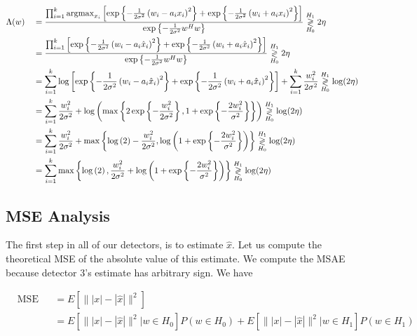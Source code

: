 \documentclass[english]{article}
\begin{document}
\begin{equation}
\begin{aligned}
&\Lambda(w)
&& = \frac{\prod_{i=1}^k\mathop{\rm argmax}_{x_i}\left[\exp\left\{-\frac{1}{2\sigma^2}\left(w_i-a_ix_i\right)^2\right\}+\exp\left\{-\frac{1}{2\sigma^2}\left(w_i+a_ix_i\right)^2\right\}\right]}{\exp\left\{-\frac{1}{2\sigma^2}w^Hw\right\}} \overset{H_1}{\underset{H_0}{\gtrless}} 2\eta\\
&&&=\frac{\prod_{i=1}^k\left[\exp\left\{-\frac{1}{2\sigma^2}\left(w_i-a_i\hat{x}_i\right)^2\right\}+\exp\left\{-\frac{1}{2\sigma^2}\left(w_i+a_i\hat{x}_i\right)^2\right\}\right]}{\exp\left\{-\frac{1}{2\sigma^2}w^Hw\right\}} \overset{H_1}{\underset{H_0}{\gtrless}} 2\eta\\
&&&=\sum_{i=1}^k\log\left[\exp\left\{-\frac{1}{2\sigma^2}\left(w_i-a_i\hat{x}_i\right)^2\right\}+\exp\left\{-\frac{1}{2\sigma^2}\left(w_i+a_i\hat{x}_i\right)^2\right\}\right] +\sum_{i=1}^k\frac{w_i^2}{2\sigma^2} \overset{H_1}{\underset{H_0}{\gtrless}} \log(2\eta)\\
&&&=\sum_{i=1}^k\frac{w_i^2}{2\sigma^2}+\log\left(\max\left\{2\exp\left\{-\frac{w_i^2}{2\sigma^2}\right\} , 1 + \exp\left\{-\frac{2w_i^2}{\sigma^2}\right\}\right\}\right)\overset{H_1}{\underset{H_0}{\gtrless}} \log(2\eta)\\
&&&=\sum_{i=1}^k\frac{w_i^2}{2\sigma^2}+\max\left\{\log\left(2\right)-\frac{w_i^2}{2\sigma^2} , \log\left(1 + \exp\left\{-\frac{2w_i^2}{\sigma^2}\right\}\right)\right\}\overset{H_1}{\underset{H_0}{\gtrless}} \log(2\eta)\\
&&&=\sum_{i=1}^k\max\left\{\log\left(2\right), \frac{w_i^2}{2\sigma^2}+\log\left(1 + \exp\left\{-\frac{2w_i^2}{\sigma^2}\right\}\right)\right\}\overset{H_1}{\underset{H_0}{\gtrless}} \log(2\eta)\\
\end{aligned}
\end{equation}

\subsection{MSE Analysis}
The first step in all of our detectors, is to estimate $\hat{x}$. Let us compute the theoretical MSE of the absolute value of this estimate. We compute the MSAE because detector 3's estimate has arbitrary sign. We have

\begin{equation}
\begin{aligned}
&\text{MSE}
&&=E[\||x|-|\hat{x}|\|^2]\\
&&&=E[\||x|-|\hat{x}|\|^2|w\in H_0]P(w\in H_0) + E[\||x|-|\hat{x}|\|^2| w\in H_1]P(w\in H_1)\\
\end{aligned}
\end{equation}
\end{document}
